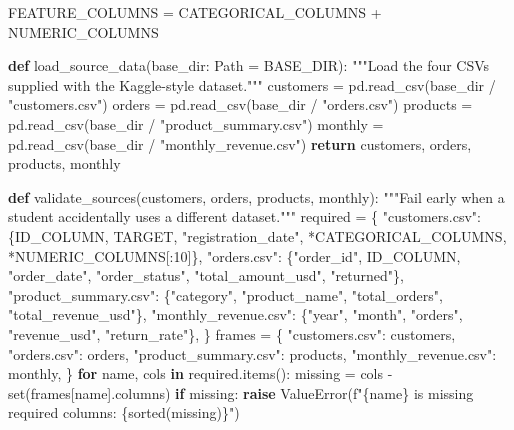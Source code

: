 \documentclass[
  indonesian,
  letterpaper,
  DIV=11,
  numbers=noendperiod]{scrreprt}
\newenvironment{Shaded}{\begin{snugshade}}{\end{snugshade}}
\newcommand{\BuiltInTok}[1]{\textcolor[rgb]{0.00,0.23,0.31}{#1}}
\newcommand{\CommentTok}[1]{\textcolor[rgb]{0.37,0.37,0.37}{#1}}
\newcommand{\ControlFlowTok}[1]{\textcolor[rgb]{0.00,0.23,0.31}{\textbf{#1}}}
\newcommand{\DecValTok}[1]{\textcolor[rgb]{0.68,0.00,0.00}{#1}}
\newcommand{\KeywordTok}[1]{\textcolor[rgb]{0.00,0.23,0.31}{\textbf{#1}}}
\newcommand{\NormalTok}[1]{\textcolor[rgb]{0.00,0.23,0.31}{#1}}
\newcommand{\OperatorTok}[1]{\textcolor[rgb]{0.37,0.37,0.37}{#1}}
\newcommand{\PreprocessorTok}[1]{\textcolor[rgb]{0.68,0.00,0.00}{#1}}
\newcommand{\SpecialCharTok}[1]{\textcolor[rgb]{0.37,0.37,0.37}{#1}}
\newcommand{\SpecialStringTok}[1]{\textcolor[rgb]{0.13,0.47,0.30}{#1}}
\newcommand{\StringTok}[1]{\textcolor[rgb]{0.13,0.47,0.30}{#1}}
\begin{document}
\begin{Shaded}
\begin{Highlighting}[]
\NormalTok{FEATURE\_COLUMNS }\OperatorTok{=}\NormalTok{ CATEGORICAL\_COLUMNS }\OperatorTok{+}\NormalTok{ NUMERIC\_COLUMNS}


\KeywordTok{def}\NormalTok{ load\_source\_data(base\_dir: Path }\OperatorTok{=}\NormalTok{ BASE\_DIR):}
    \CommentTok{"""Load the four CSVs supplied with the Kaggle{-}style dataset."""}
\NormalTok{    customers }\OperatorTok{=}\NormalTok{ pd.read\_csv(base\_dir }\OperatorTok{/} \StringTok{"customers.csv"}\NormalTok{)}
\NormalTok{    orders }\OperatorTok{=}\NormalTok{ pd.read\_csv(base\_dir }\OperatorTok{/} \StringTok{"orders.csv"}\NormalTok{)}
\NormalTok{    products }\OperatorTok{=}\NormalTok{ pd.read\_csv(base\_dir }\OperatorTok{/} \StringTok{"product\_summary.csv"}\NormalTok{)}
\NormalTok{    monthly }\OperatorTok{=}\NormalTok{ pd.read\_csv(base\_dir }\OperatorTok{/} \StringTok{"monthly\_revenue.csv"}\NormalTok{)}
    \ControlFlowTok{return}\NormalTok{ customers, orders, products, monthly}


\KeywordTok{def}\NormalTok{ validate\_sources(customers, orders, products, monthly):}
    \CommentTok{"""Fail early when a student accidentally uses a different dataset."""}
\NormalTok{    required }\OperatorTok{=}\NormalTok{ \{}
        \StringTok{"customers.csv"}\NormalTok{: \{ID\_COLUMN, TARGET, }\StringTok{"registration\_date"}\NormalTok{, }\OperatorTok{*}\NormalTok{CATEGORICAL\_COLUMNS, }\OperatorTok{*}\NormalTok{NUMERIC\_COLUMNS[:}\DecValTok{10}\NormalTok{]\},}
        \StringTok{"orders.csv"}\NormalTok{: \{}\StringTok{"order\_id"}\NormalTok{, ID\_COLUMN, }\StringTok{"order\_date"}\NormalTok{, }\StringTok{"order\_status"}\NormalTok{, }\StringTok{"total\_amount\_usd"}\NormalTok{, }\StringTok{"returned"}\NormalTok{\},}
        \StringTok{"product\_summary.csv"}\NormalTok{: \{}\StringTok{"category"}\NormalTok{, }\StringTok{"product\_name"}\NormalTok{, }\StringTok{"total\_orders"}\NormalTok{, }\StringTok{"total\_revenue\_usd"}\NormalTok{\},}
        \StringTok{"monthly\_revenue.csv"}\NormalTok{: \{}\StringTok{"year"}\NormalTok{, }\StringTok{"month"}\NormalTok{, }\StringTok{"orders"}\NormalTok{, }\StringTok{"revenue\_usd"}\NormalTok{, }\StringTok{"return\_rate"}\NormalTok{\},}
\NormalTok{    \}}
\NormalTok{    frames }\OperatorTok{=}\NormalTok{ \{}
        \StringTok{"customers.csv"}\NormalTok{: customers,}
        \StringTok{"orders.csv"}\NormalTok{: orders,}
        \StringTok{"product\_summary.csv"}\NormalTok{: products,}
        \StringTok{"monthly\_revenue.csv"}\NormalTok{: monthly,}
\NormalTok{    \}}
    \ControlFlowTok{for}\NormalTok{ name, cols }\KeywordTok{in}\NormalTok{ required.items():}
\NormalTok{        missing }\OperatorTok{=}\NormalTok{ cols }\OperatorTok{{-}} \BuiltInTok{set}\NormalTok{(frames[name].columns)}
        \ControlFlowTok{if}\NormalTok{ missing:}
            \ControlFlowTok{raise} \PreprocessorTok{ValueError}\NormalTok{(}\SpecialStringTok{f"}\SpecialCharTok{\{}\NormalTok{name}\SpecialCharTok{\}}\SpecialStringTok{ is missing required columns: }\SpecialCharTok{\{}\BuiltInTok{sorted}\NormalTok{(missing)}\SpecialCharTok{\}}\SpecialStringTok{"}\NormalTok{)}



\end{Highlighting}
\end{Shaded}
\end{document}
